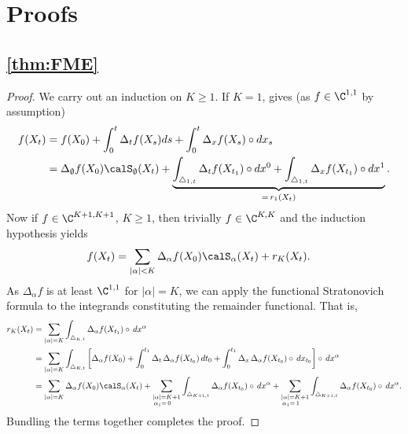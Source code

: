 \section{Proofs}

\subsection{\cref{thm:FME}}
\label{app:FME}
\begin{proof} We carry out an induction on $K \ge 1$. If $K=1$,   gives (as $f\in \C^{1,1}$ by assumption)
\begin{align*}
    f(X_t) &= f(X_0) + \int_0^t \Delta_t f(X_s)  ds + \int_0^t\Delta_x f(X_s) \circ dx_s\\
        &= \Delta_{\emptyset}f(X_0) \calS_{\emptyset}(X_t)+ \underbrace{\int_{\triangle_{1,t}} \Delta_t f(X_{t_1})  \circ  dx^{0} +\int_{\triangle_{1,t}} \Delta_x f(X_{t_1}) \circ  dx^{1}}_{= \, r_1(X_t)}.
\end{align*}
 Now if $f\in \C^{K+1,K+1}$, $K\ge 1$, then trivially $f\in  \C^{K,K}$ and the induction hypothesis yields
\begin{align*}
    f(X_t) &= \sum_{|\alpha|< K}  \Delta_{\alpha}f(X_0) \calS_{\alpha}(X_t) + r_{K}(X_t).
\end{align*}
As  $\Delta_{\alpha}f$ is at least $\C^{1,1}$ for $|\alpha| = K$, we can apply the functional Stratonovich formula to the integrands constituting the remainder functional. That is,
\begin{align*}
    r_{K}(X_t) &= \sum_{|\alpha| = K} \int_{\triangle_{K,t}} \Delta_{\alpha}f(X_{t_1}) \circ \, dx^{\alpha}\\
    &= \sum_{|\alpha| = K}\int_{\triangle_{K,t}} \left[ \Delta_{\alpha}f(X_{0})   + \int_0^{t_1} \Delta_t \, \Delta_{\alpha}f(X_{t_0})\, dt_0 + \int_0^{t_1} \Delta_x \, \Delta_{\alpha}f(X_{t_0})\circ \, dx_{t_0} \right] \circ \, dx^{\alpha} \\
    &= \sum_{|\alpha| = K} \Delta_{\alpha}f(X_{0})\calS_{\alpha}(X_t) 
    + \sum_{\substack{|\alpha| = K+1 \\ \alpha_1 =\,0\phantom{+2}}} \int_{\triangle_{K+1,t}} \Delta_{\alpha}f(X_{t_0}) \circ \, dx^{\alpha} 
    + \sum_{\substack{|\alpha| = K+1 \\ \alpha_1 = \,1\phantom{+2}}} \int_{\triangle_{K+1,t}} \Delta_{\alpha}f(X_{t_0}) \circ \, dx^{\alpha}.
\end{align*}
Bundling the terms together completes the proof. 
\end{proof}  


